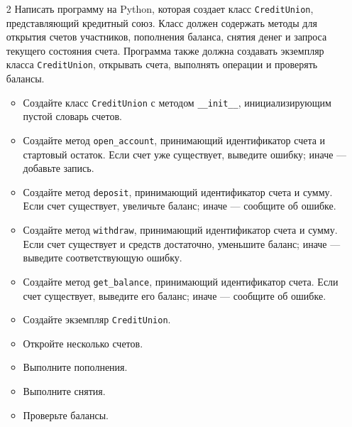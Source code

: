 \begin{enumerate}
\textbf{Пример использования:}

\begin{verbatim}
bank = Bank()
acno1 = "SB-123"
damt1 = 1000
print("Новый номер счета: ", acno1, " Внесенная сумма: ", damt1)
bank.create_account(acno1, damt1)
acno2 = "SB-124"
damt2 = 1500
print("Новый номер счета: ", acno2, " Внесенная сумма: ", damt2)
bank.create_account(acno2, damt2)
wamt1 = 600
print("\nДепозит средств: ", wamt1, " на счет № ", acno1)
bank.make_deposit(acno1, wamt1)
wamt2 = 350
print("Вывод средств: ", wamt2, " со счета № ", acno2)
bank.make_withdrawal(acno2, wamt2)
print("Номер расчетного счета: ", acno1)
bank.check_balance(acno1)
print("Номер расчетного счета: ", acno2)
bank.check_balance(acno2)
wamt3 = 1200
print("Вывод средств: ", wamt3, " со счета № ", acno2)
bank.make_withdrawal(acno2, wamt3)
acno3 = "SB-134"
print("Проверка баланса счета № ", acno3)
bank.check_balance(acno3)  # Non-existent account number
\end{verbatim}

\item[2] Написать программу на Python, которая создает класс \texttt{CreditUnion}, представляющий кредитный союз. Класс должен содержать методы для открытия счетов участников, пополнения баланса, снятия денег и запроса текущего состояния счета. Программа также должна создавать экземпляр класса \texttt{CreditUnion}, открывать счета, выполнять операции и проверять балансы.

\begin{itemize}
    \item Создайте класс \texttt{CreditUnion} с методом \texttt{\_\_init\_\_}, инициализирующим пустой словарь счетов.
    \item Создайте метод \texttt{open\_account}, принимающий идентификатор счета и стартовый остаток. Если счет уже существует, выведите ошибку; иначе — добавьте запись.
    \item Создайте метод \texttt{deposit}, принимающий идентификатор счета и сумму. Если счет существует, увеличьте баланс; иначе — сообщите об ошибке.
    \item Создайте метод \texttt{withdraw}, принимающий идентификатор счета и сумму. Если счет существует и средств достаточно, уменьшите баланс; иначе — выведите соответствующую ошибку.
    \item Создайте метод \texttt{get\_balance}, принимающий идентификатор счета. Если счет существует, выведите его баланс; иначе — сообщите об ошибке.
    \item Создайте экземпляр \texttt{CreditUnion}.
    \item Откройте несколько счетов.
    \item Выполните пополнения.
    \item Выполните снятия.
    \item Проверьте балансы.
\end{itemize}


\end{enumerate}
